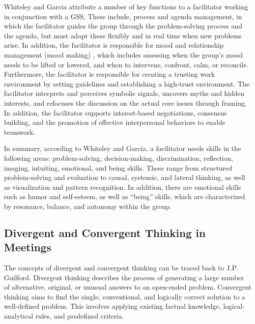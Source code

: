 Whiteley and Garcia attribute a number of key functions to a facilitator working in conjunction with a GSS.
These include, process and agenda management, in which the facilitator guides the group through the
problem-solving process and the agenda, but must adapt these flexibly and in real time when new problems arise. \cite[p.
36]{whiteleyFacilitatorChauffeurGSS1996} \cite[p. 31]{whiteleyFacilitatorChauffeurGSS1996}
In addition, the facilitator is responsible for mood and relationship management (mood making)
\cite[p.33]{whiteleyFacilitatorChauffeurGSS1996} , which includes
assessing when the group’s mood needs to be lifted
or lowered, and when to intervene, confront, calm, or reconcile.
\cite[p.31]{whiteleyFacilitatorChauffeurGSS1996}
Furthermore, the facilitator is responsible for creating a trusting work environment by
setting guidelines and establishing a high-trust environment.
\cite[p.31]{whiteleyFacilitatorChauffeurGSS1996}
The facilitator interprets and perceives symbolic signals, uncovers myths and hidden interests, and
refocuses the discussion on the actual core issues through framing.
\cite[p.32]{whiteleyFacilitatorChauffeurGSS1996}
In addition, the facilitator supports interest-based negotiations,
consensus building, and the promotion of effective interpersonal behaviors to enable teamwork.
\cite[p.34]{whiteleyFacilitatorChauffeurGSS1996}

In summary, according to Whiteley and Garcia, a facilitator needs skills in the following areas:
problem-solving, decision-making, discrimination, reflection, imaging, intuiting, emotional, and being
skills. These range from structured problem-solving and evaluation to causal, systemic, and
lateral thinking, as well as visualization and pattern recognition. In addition, there are emotional skills such as
humor and self-esteem, as well as “being” skills, which are characterized by resonance, balance, and autonomy
within the group. \cite[p.34]{whiteleyFacilitatorChauffeurGSS1996}

\subsection{Divergent and Convergent Thinking in Meetings}
\label{sec:divergent-convergent}

The concepts of divergent and convergent thinking can be traced back to J.P. Guilford.
Divergent thinking describes the process of generating a large number of alternative, original, or unusual
answers to an open-ended problem.
Convergent thinking aims to find the single, conventional, and logically correct solution to a well-defined problem.
This involves applying existing factual knowledge, logical-analytical rules, and predefined criteria.
\cite[p. 759]{razumnikovaDivergentConvergentThinking2020}

